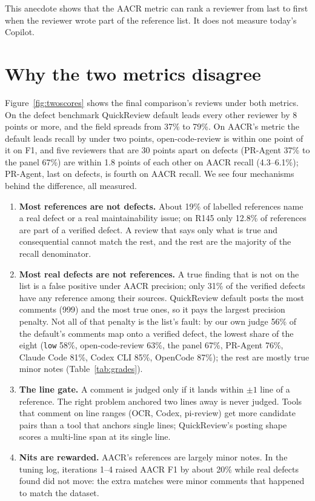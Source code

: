 \documentclass[11pt,a4paper]{article}
\newcommand{\qcr}{QuickReview}
\newcommand{\code}[1]{\texttt{#1}}
\begin{document}
This anecdote shows that the AACR metric can rank a reviewer from last to
first when the reviewer wrote part of the reference list. It does not
measure today's Copilot.

\section{Why the two metrics disagree}
\label{sec:disagree}

Figure~\ref{fig:twoscores} shows the final comparison's reviews under both
metrics. On the defect benchmark \qcr{} default leads every other reviewer
by 8 points or more, and the field spreads from 37\% to 79\%. On AACR's
metric the default leads recall by under two points, open-code-review is
within one point of it on F1, and five reviewers that are 30 points apart
on defects (PR-Agent 37\% to the panel 67\%) are within 1.8 points of
each other on AACR recall (4.3--6.1\%); PR-Agent, last on defects, is
fourth on AACR recall. We see four mechanisms behind the difference, all
measured.

\begin{enumerate}
  \item \textbf{Most references are not defects.} About 19\% of labelled
  references name a real defect or a real maintainability issue; on R145
  only 12.8\% of references are part of a verified defect. A
  review that says only what is true and consequential cannot match the
  rest, and the rest are the majority of the recall denominator.
  \item \textbf{Most real defects are not references.} A true finding that
  is not on the list is a false positive under AACR precision; only 31\%
  of the verified defects have any reference among their sources. \qcr{}
  default posts the most comments (999) and the most true ones, so it pays
  the largest precision penalty. Not all of that penalty is the list's
  fault: by our own judge 56\% of the default's comments map onto a
  verified defect, the lowest share of the eight (\code{low} 58\%,
  open-code-review 63\%, the panel 67\%, PR-Agent 76\%, Claude Code 81\%,
  Codex CLI 85\%, OpenCode 87\%); the rest are mostly true minor notes
  (Table~\ref{tab:grades}).
  \item \textbf{The line gate.} A comment is judged only if it lands within
  $\pm1$ line of a reference. The right problem anchored two lines away is
  never judged. Tools that comment on line ranges (OCR, Codex, pi-review)
  get more candidate pairs than a tool that anchors single lines; \qcr{}'s
  posting shape scores a multi-line span at its single line.
  \item \textbf{Nits are rewarded.} AACR's references are largely minor
  notes. In the tuning log, iterations 1--4 raised AACR F1 by about 20\%
  while real defects found did not move: the extra matches were minor
  comments that happened to match the dataset.
\end{enumerate}
\end{document}
